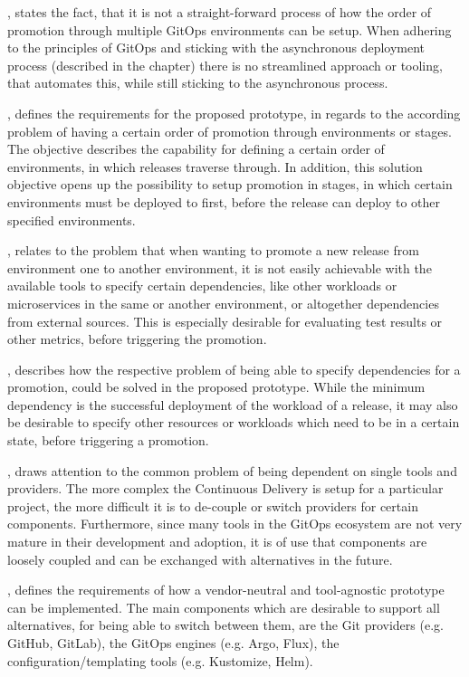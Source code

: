 ,
states the fact, that it is not a straight-forward process of how the order of promotion
through multiple GitOps environments can be setup. When adhering to the principles of GitOps
and sticking with the asynchronous deployment process (described in the
 chapter)
there is no streamlined approach or tooling, that automates this, while still sticking to the asynchronous process.

,
defines the requirements for the proposed prototype,
in regards to the according problem of having a certain order of promotion through environments or stages.
The objective describes the capability for defining a certain order of environments, in which releases traverse through.
In addition, this solution objective opens up the possibility to setup promotion in stages, in which
certain environments must be deployed to first, before the release can deploy to other specified environments.

,
relates to the problem that when wanting to promote a new release from environment one to another environment,
it is not easily achievable with the available tools to specify certain dependencies, like other workloads or
microservices in the same or another environment, or altogether dependencies from external sources.
This is especially desirable for evaluating test results or other metrics, before triggering the promotion.

,
describes how the respective problem of being able to specify dependencies for a promotion,
could be solved in the proposed prototype. While the minimum dependency is the successful deployment
of the workload of a release,
it may also be desirable to specify other resources or workloads which need to be in a certain state,
before triggering a promotion.

,
draws attention to the common problem of being dependent on single tools and providers.
The more complex the Continuous Delivery is setup for a particular project,
the more difficult it is to de-couple or switch providers for certain components.
Furthermore, since many tools in the GitOps ecosystem are not very mature in their development and adoption,
it is of use that components are loosely coupled and can be exchanged with alternatives in the future.

,
defines the requirements of how a vendor-neutral and tool-agnostic prototype can be implemented.
The main components which are desirable to support all alternatives,
for being able to switch between them,
are the Git providers (e.g. GitHub, GitLab),
the GitOps engines (e.g. Argo, Flux),
the configuration/templating tools (e.g. Kustomize, Helm).

